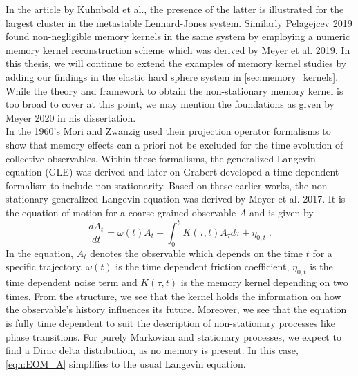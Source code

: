 In the article by Kuhnbold et al., the presence of the latter is illustrated for the largest cluster in the metastable Lennard-Jones system. Similarly Pelagejcev 2019\cite{ThesisPhilipp} found non-negligible memory kernels in the same system by employing a numeric memory kernel reconstruction scheme which was derived by Meyer et al. 2019\cite{Meyer2019a}. In this thesis, we will continue to extend the examples of memory kernel studies by adding our findings in the elastic hard sphere system in \autoref{sec:memory_kernels}.\\

While the theory and framework to obtain the non-stationary memory kernel is too broad to cover at this point, we may mention the foundations as given by Meyer 2020\cite{MeyerThesis} in his dissertation.\\

In the 1960's Mori and Zwanzig used their projection operator formalisms to show that memory effects can a priori not be excluded for the time evolution of collective observables. Within these formalisms, the generalized Langevin equation (GLE) was derived and later on Grabert developed a time dependent formalism to include non-stationarity. Based on these earlier works, the non-stationary generalized Langevin equation was derived by Meyer et al. 2017\cite{Meyer_nsGLE}. It is the equation of motion for a coarse grained observable $A$ and is given by
\begin{equation}
\label{eqn:EOM_A}
  \frac{d A_{t}}{dt} = \omega (t) A_{t} + \int_{0}^{t} K(\tau, t) A_{\tau} d\tau + \eta_{0,t} \; \text{.}
\end{equation}
In the equation, $A_{t}$ denotes the observable which depends on the time $t$ for a specific trajectory, $\omega (t)$ is the time dependent friction coefficient, $\eta_{0,t}$ is the time dependent noise term and $K(\tau, t)$ is the memory kernel depending on two times. From the structure, we see that the kernel holds the information on how the observable's history influences its future. Moreover, we see that the equation is fully time dependent to suit the description of non-stationary processes like phase transitions. For purely Markovian and stationary processes, we expect to find a Dirac delta distribution, as no memory is present. In this case, \autoref{eqn:EOM_A} simplifies to the usual Langevin equation.\\

